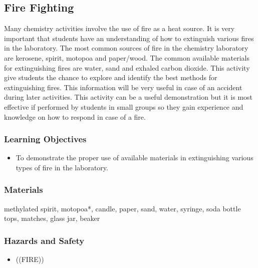 \subsection{Fire Fighting}
Many chemistry activities involve the use of fire as a heat source. It is very important that students have an understanding of how to extinguish various fires in the laboratory. The most common sources of fire in the chemistry laboratory are kerosene, spirit, motopoa and paper/wood. The common available materials for extinguishing fires are water, sand and exhaled carbon dioxide. This activity give students the chance to explore and identify the best methods for extinguishing fires. This information will be very useful in case of an accident during later activities. This activity can be a useful demonstration but it is most effective if performed by students in small groups so they gain experience and knowledge on how to respond in case of a fire.
\subsubsection*{Learning Objectives}
\begin{itemize}
\item{To demonstrate the proper use of available materials in extinguishing various types of fire in the laboratory.}
\end{itemize}

\subsubsection*{Materials}
methylated spirit, motopoa*, candle, paper, sand, water, syringe, soda bottle tops, matches, glass jar, beaker

\subsubsection*{Hazards and Safety}
\begin{itemize}
\item{((FIRE))}
\end{itemize}

